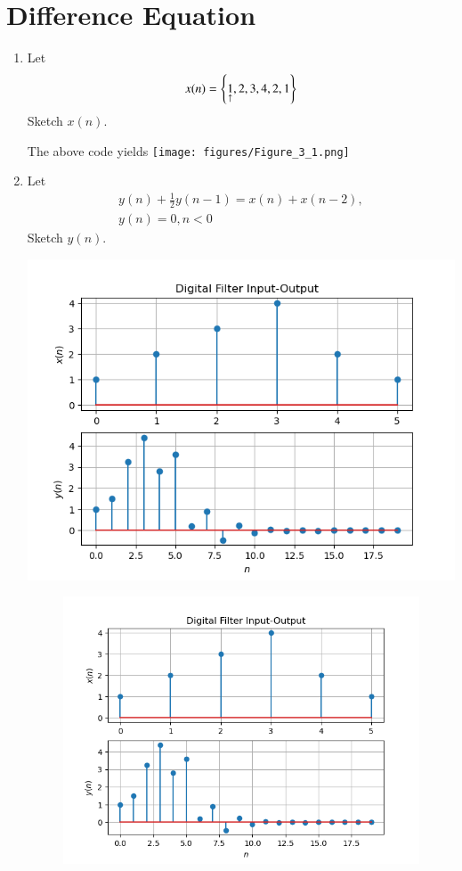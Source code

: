 \section{Difference Equation}
\begin{enumerate}[label=\thesection.\arabic*,ref=\thesection.\theenumi]
\item Let
\begin{equation}
x(n) = \left\{\underset{\uparrow}{1},2,3,4,2,1\right\}
\end{equation}
Sketch $x(n)$.
\solution

The above code yields
\texttt{[image: figures/Figure\_3\_1.png]}
\item Let
\begin{multline}
\label{eq:iir_filter}
y(n) + \frac{1}{2}y(n-1) = x(n) + x(n-2),
\\
 y(n) = 0, n < 0
\end{multline}
Sketch $y(n)$.  
\\
\solution 

\includegraphics[width=\columnwidth]{figures/Figure_3_2.png}
\begin{figure}[!ht]
\begin{center}
\includegraphics[width=\columnwidth]{./figures/Figure_3_2.png}

\end{center}
\end{figure}
\end{enumerate}
